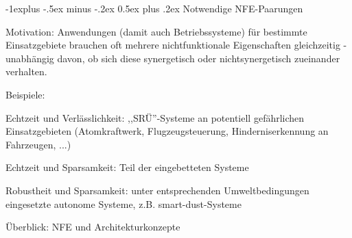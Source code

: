 \documentclass[a4paper]{article}
\makeatletter
\newcommand{\cmark}{\ding{51}}
\newcommand{\xmark}{\ding{55}}
\renewcommand{\subsection}{\@startsection{subsection}{2}{0mm}%
 {-1explus -.5ex minus -.2ex}%
 {0.5ex plus .2ex}%
 {\normalfont\normalsize\bfseries}}
\makeatother
\begin{document}
\begin{multicols}{3}
    \subsection{Notwendige NFE-Paarungen}

    \begin{itemize*}
        \item
        Motivation: Anwendungen (damit auch Betriebssysteme) für bestimmte
        Einsatzgebiete brauchen oft mehrere nichtfunktionale Eigenschaften
        gleichzeitig - unabhängig davon, ob sich diese synergetisch oder
        nichtsynergetisch zueinander verhalten.
        \item
        Beispiele:
        \begin{itemize*}
            \item Echtzeit und Verlässlichkeit: ,,SRÜ''-Systeme an potentiell gefährlichen Einsatzgebieten (Atomkraftwerk, Flugzeugsteuerung, Hinderniserkennung an Fahrzeugen, ...)
            \item Echtzeit und Sparsamkeit: Teil der eingebetteten Systeme
            \item Robustheit und Sparsamkeit: unter entsprechenden Umweltbedingungen eingesetzte autonome Systeme, z.B. smart-dust-Systeme
        \end{itemize*}
    \end{itemize*}

    Überblick: NFE und Architekturkonzepte



\end{multicols}
\end{document}
